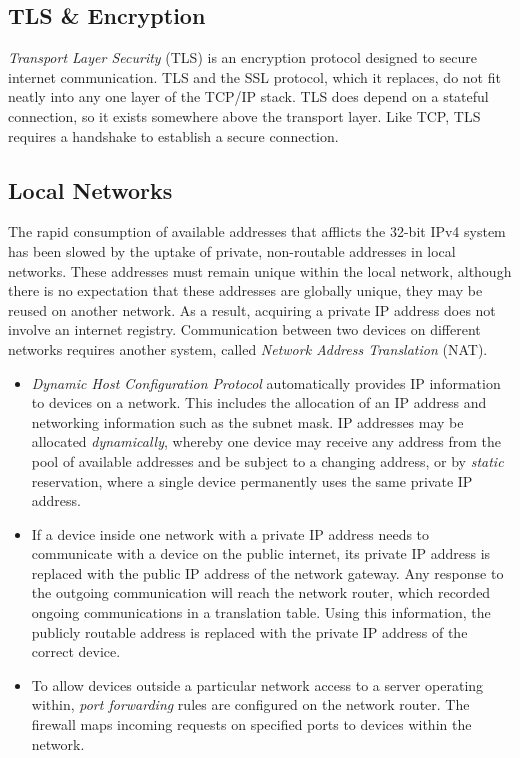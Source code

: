 \documentclass[10pt]{article}
\begin{document}
\subsection{TLS \& Encryption}
\label{sec:orgb6219ef}

\emph{Transport Layer Security} (TLS) is an encryption protocol designed to secure internet communication. TLS and the SSL protocol, which it replaces, do not fit neatly into any one layer of the TCP/IP stack. TLS does depend on a stateful connection, so it exists somewhere above the transport layer. Like TCP, TLS requires a handshake to establish a secure connection.

\subsection{Local Networks}
\label{sec:org1366219}

The rapid consumption of available addresses that afflicts the 32-bit IPv4 system has been slowed by the uptake of private, non-routable addresses in local networks. These addresses must remain unique within the local network, although there is no expectation that these addresses are globally unique, they may be reused on another network. As a result, acquiring a private IP address does not involve an internet registry. Communication between two devices on different networks requires another system, called \emph{Network Address Translation} (NAT).

\begin{itemize}
\item \emph{Dynamic Host Configuration Protocol} automatically provides IP information to devices on a network. This includes the allocation of an IP address and networking information such as the subnet mask. IP addresses may be allocated \emph{dynamically}, whereby one device may receive any address from the pool of available addresses and be subject to a changing address, or by \emph{static} reservation, where a single device permanently uses the same private IP address.

\item If a device inside one network with a private IP address needs to communicate with a device on the public internet, its private IP address is replaced with the public IP address of the network gateway. Any response to the outgoing communication will reach the network router, which recorded ongoing communications in a translation table. Using this information, the publicly routable address is replaced with the private IP address of the correct device.

\item To allow devices outside a particular network access to a server operating within, \emph{port forwarding} rules are configured on the network router. The firewall maps incoming requests on specified ports to devices within the network.
\end{itemize}
\end{document}
